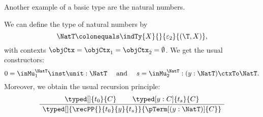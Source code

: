 \documentclass[preprint]{sigplanconf}
\begin{document}
Another example of a basic type are the natural numbers.
\begin{example}
  We can define the type of natural numbers by
  \begin{equation*}
    \NatT \colonequals \indTy{X}{}{\varepsilon_2}{(\T, X)},
  \end{equation*}
  with contexts $\objCtx = \objCtx_1 = \objCtx_2 = \emptyset$.
  We get the usual constructors:
\begin{equation*}
    0 = \inMu_1^{\NatT} \inst \unit : \NatT
    \quad \text{ and } \quad
    s = \inMu_2^{\NatT} : (y : \NatT) \ctxTo \NatT.
  \end{equation*}
  Moreover, we obtain the usual recursion principle:
  \begin{equation*}
    \AxiomC{$\typed[]{t_0}{C}$}
    \AxiomC{$\typed[y : C]{t_s}{C}$}
    \BinaryInfC{$\typed[]{\recPP{}{t_0}{y}{t_s}}{\pTerm[(y : \NatT)]{C}}$}
    \DisplayProof
  \end{equation*}
\end{example}
\end{document}
